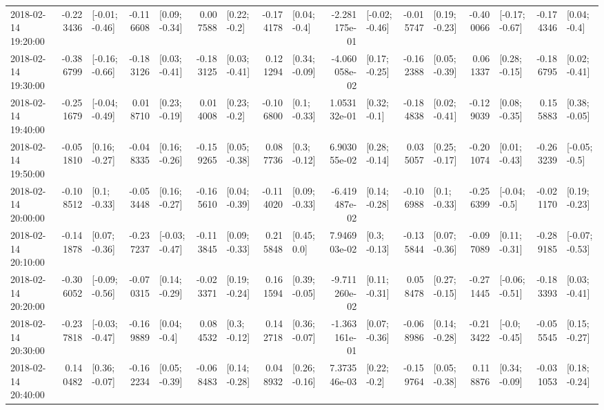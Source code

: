 \begin{tabular}{lrlrlrlrlrlrlrlrl}
2018-02-14 19:20:00 & -0.223436 &  [-0.01; -0.46] & -0.116608 &   [0.09; -0.34] &  0.007588 &    [0.22; -0.2] & -0.174178 &    [0.04; -0.4] & -2.281175e-01 &  [-0.02; -0.46] & -0.015747 &   [0.19; -0.23] & -0.400066 &  [-0.17; -0.67] & -0.174346 &    [0.04; -0.4] \\
2018-02-14 19:30:00 & -0.386799 &  [-0.16; -0.66] & -0.183126 &   [0.03; -0.41] & -0.183125 &   [0.03; -0.41] &  0.121294 &   [0.34; -0.09] & -4.060058e-02 &   [0.17; -0.25] & -0.162388 &   [0.05; -0.39] &  0.061337 &   [0.28; -0.15] & -0.186795 &   [0.02; -0.41] \\
2018-02-14 19:40:00 & -0.251679 &  [-0.04; -0.49] &  0.018710 &   [0.23; -0.19] &  0.014008 &    [0.23; -0.2] & -0.106800 &    [0.1; -0.33] &  1.053132e-01 &    [0.32; -0.1] & -0.184838 &   [0.02; -0.41] & -0.129039 &   [0.08; -0.35] &  0.155883 &   [0.38; -0.05] \\
2018-02-14 19:50:00 & -0.051810 &   [0.16; -0.27] & -0.048335 &   [0.16; -0.26] & -0.159265 &   [0.05; -0.38] &  0.087736 &    [0.3; -0.12] &  6.903055e-02 &   [0.28; -0.14] &  0.035057 &   [0.25; -0.17] & -0.201074 &   [0.01; -0.43] & -0.263239 &   [-0.05; -0.5] \\
2018-02-14 20:00:00 & -0.108512 &    [0.1; -0.33] & -0.053448 &   [0.16; -0.27] & -0.165610 &   [0.04; -0.39] & -0.114020 &   [0.09; -0.33] & -6.419487e-02 &   [0.14; -0.28] & -0.106988 &    [0.1; -0.33] & -0.256399 &   [-0.04; -0.5] & -0.021170 &   [0.19; -0.23] \\
2018-02-14 20:10:00 & -0.141878 &   [0.07; -0.36] & -0.237237 &  [-0.03; -0.47] & -0.113845 &   [0.09; -0.33] &  0.215848 &     [0.45; 0.0] &  7.946903e-02 &    [0.3; -0.13] & -0.135844 &   [0.07; -0.36] & -0.097089 &   [0.11; -0.31] & -0.289185 &  [-0.07; -0.53] \\
2018-02-14 20:20:00 & -0.306052 &  [-0.09; -0.56] & -0.070315 &   [0.14; -0.29] & -0.023371 &   [0.19; -0.24] &  0.161594 &   [0.39; -0.05] & -9.711260e-02 &   [0.11; -0.31] &  0.058478 &   [0.27; -0.15] & -0.271445 &  [-0.06; -0.51] & -0.183393 &   [0.03; -0.41] \\
2018-02-14 20:30:00 & -0.237818 &  [-0.03; -0.47] & -0.169889 &    [0.04; -0.4] &  0.084532 &    [0.3; -0.12] &  0.142718 &   [0.36; -0.07] & -1.363161e-01 &   [0.07; -0.36] & -0.068986 &   [0.14; -0.28] & -0.213422 &   [-0.0; -0.45] & -0.055545 &   [0.15; -0.27] \\
2018-02-14 20:40:00 &  0.140482 &   [0.36; -0.07] & -0.162234 &   [0.05; -0.39] & -0.068483 &   [0.14; -0.28] &  0.048932 &   [0.26; -0.16] &  7.373546e-03 &    [0.22; -0.2] & -0.159764 &   [0.05; -0.38] &  0.118876 &   [0.34; -0.09] & -0.031053 &   [0.18; -0.24] \\

\end{tabular}

